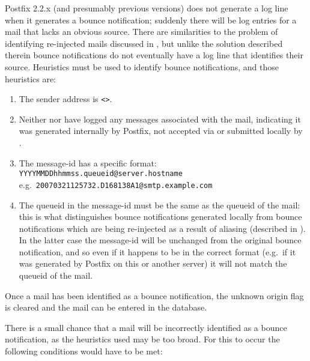 Postfix 2.2.x (and presumably previous versions) does not generate a log
line when it generates a bounce notification; suddenly there will be log
entries for a mail that lacks an obvious source.  There are similarities to
the problem of identifying re-injected mails discussed in
, but unlike the solution described
therein bounce notifications do not eventually have a log line that
identifies their source.  Heuristics must be used to identify bounce
notifications, and those heuristics are:

\begin{enumerate}

    \item The sender address is \verb!<>!.

    \item Neither  nor  have logged any
        messages associated with the mail, indicating it was generated
        internally by Postfix, not accepted via \SMTP{} or submitted
        locally by .

    \item The message-id has a specific format: \newline{}
        \tab{} \texttt{YYYYMMDDhhmmss.queueid@server.hostname} \newline{}
        e.g.\ \texttt{20070321125732.D168138A1@smtp.example.com}

    \item The queueid in the message-id must be the same as the queueid of
        the mail: this is what distinguishes bounce notifications generated
        locally from bounce notifications which are being re-injected as a
        result of aliasing (described in ).
        In the latter case the message-id will be unchanged from the
        original bounce notification, and so even if it happens to be in
        the correct format (e.g.\ if it was generated by Postfix on this or
        another server) it will not match the queueid of the mail.

\end{enumerate}

Once a mail has been identified as a bounce notification, the unknown
origin flag is cleared and the mail can be entered in the database.

There is a small chance that a mail will be incorrectly identified as a
bounce notification, as the heuristics used may be too broad.  For this to
occur the following conditions would have to be met:

